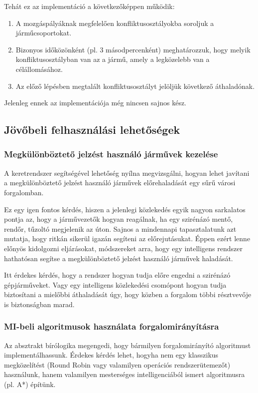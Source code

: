 \documentclass{article}
\begin{document}
				Tehát ez az implementáció a következőképpen működik:
				\begin{enumerate}
					\item A mozgáspályáknak megfelelően konfliktusosztályokba soroljuk a járműcsoportokat.
					\item Bizonyos időközönként (pl. 3 másodpercenként) meghatározzuk, hogy melyik konfliktusosztályban van az a jármű, amely a legközelebb van a célállomásához.
					\item Az előző lépésben megtalált konfliktusosztályt jelöljük következő áthaladónak.
				\end{enumerate}
			
				Jelenleg ennek az implementációja még nincsen sajnos kész.
				
		\subsection{Jövőbeli felhasználási lehetőségek}
			\subsubsection{Megkülönböztető jelzést használó járművek kezelése}
				A keretrendszer segítségével lehetőség nyílna megvizsgálni, hogyan lehet javítani a megkülönböztető jelzést használó járművek előrehaladását egy sűrű városi forgalomban.
				
				Ez egy igen fontos kérdés, hiszen a jelenlegi közlekedés egyik nagyon sarkalatos pontja az, hogy a járművezetők hogyan reagálnak, ha egy szirénázó mentő, rendőr, tűzoltó megjelenik az úton. Sajnos a mindennapi tapasztalatunk azt mutatja, hogy ritkán sikerül igazán segíteni az előrejutásukat. Éppen ezért lenne előnyös kidolgozni eljárásokat, módszereket arra, hogy egy intelligens rendszer hathatósan segítse a megkülönböztető jelzést használó járművek haladását.
				
				Itt érdekes kérdés, hogy a rendszer hogyan tudja előre engedni a szirénázó gépjárműveket. Vagy egy intelligens közlekedési csomópont hogyan tudja biztosítani a mielőbbi áthaladását úgy, hogy közben a forgalom többi résztvevője is biztonságban marad.
				
			\subsubsection{MI-beli algoritmusok használata forgalomirányításra}
				Az absztrakt bírólogika megengedi, hogy bármilyen forgalomirányító algoritmust implementálhassunk. Érdekes kérdés lehet, hogyha nem egy klasszikus megközelítést (Round Robin vagy valamilyen operációs rendszerütemezőt) használunk, hanem valamilyen mesterséges intelligenciából ismert algoritmusra (pl. A*) építünk.
				
\end{document}
